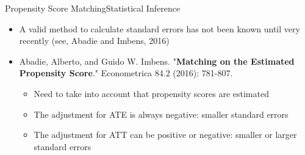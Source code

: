\documentclass[hyperref={pdfpagelabels=false}]{beamer}
\begin{document}
\begin{frame}{Propensity Score Matching}{Statistical Inference}
	\begin{itemize}
		
		\item A valid method to calculate standard errors has not been known until very recently (see, Abadie and Imbens, 2016)
		\vspace{0.2cm}
			\item Abadie, Alberto, and Guido W. Imbens. "\textbf{Matching on the Estimated Propensity Score}." Econometrica 84.2 (2016): 781-807.
		\vspace{0.2cm}
		\begin{itemize}		
		
			\item Need to take into account that propensity scores are estimated
			\vspace{0.2cm}
			\item The adjustment for ATE is always negative: smaller standard errors	
			\vspace{0.2cm}
			\item The adjustment for ATT can be positive or negative: smaller or larger standard errors				
		\end{itemize}		
	\end{itemize}
\end{frame}
\end{document}
